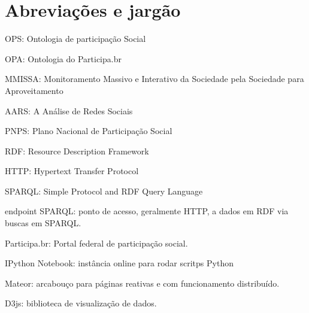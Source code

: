 \section*{Abreviações e jargão}

OPS: Ontologia de participação Social

OPA: Ontologia do Participa.br

MMISSA: Monitoramento Massivo e Interativo da Sociedade pela Sociedade para Aproveitamento

AARS: A Análise de Redes Sociais

PNPS: Plano Nacional de Participação Social

RDF: Resource Description Framework

HTTP: Hypertext Transfer Protocol

SPARQL:  Simple Protocol and RDF Query Language

endpoint SPARQL: ponto de acesso, geralmente HTTP, a dados em RDF via buscas em SPARQL.

Participa.br: Portal federal de participação social.

IPython Notebook: instância online para rodar scritps Python

Mateor: arcabouço para páginas reativas e com funcionamento distribuído.

D3js: biblioteca de visualização de dados.
